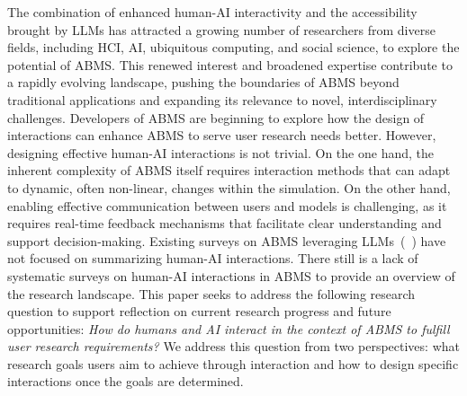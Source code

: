 The combination of enhanced human-AI interactivity and the accessibility brought by LLMs has attracted a growing number of researchers from diverse fields, including HCI, AI, ubiquitous computing, and social science, to explore the potential of ABMS. 
This renewed interest and broadened expertise contribute to a rapidly evolving landscape, pushing the boundaries of ABMS beyond traditional applications and expanding its relevance to novel, interdisciplinary challenges.
Developers of ABMS are beginning to explore how the design of interactions can enhance ABMS to serve user research needs better.
However, designing effective human-AI interactions is not trivial.
On the one hand, the inherent complexity of ABMS itself requires interaction methods that can adapt to dynamic, often non-linear, changes within the simulation.
On the other hand, enabling effective communication between users and models is challenging, as it requires real-time feedback mechanisms that facilitate clear understanding and support decision-making.
Existing surveys on ABMS leveraging LLMs~(\eg~\cite{gao_large_2023}) have not focused on summarizing human-AI interactions.%
There still is a lack of systematic surveys on human-AI interactions in ABMS to provide an overview of the research landscape.
This paper seeks to address the following research question to support reflection on current research progress and future opportunities: \textit{How do humans and AI interact in the context of ABMS to fulfill user research requirements?} 
We address this question from two perspectives: what research goals users aim to achieve through interaction and how to design specific interactions once the goals are determined. %

